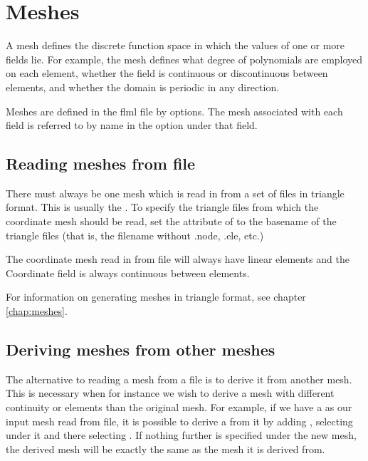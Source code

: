 \section{Meshes}\label{Sect:Mesh}

A mesh defines the discrete
function space in which the values of one or more fields lie. For example, the mesh
defines what degree of polynomials are employed on each element, whether the
field is continuous or discontinuous between elements, and whether the
domain is periodic in any direction. 

Meshes are defined in the flml file by  options. The
mesh associated with each field is referred to by name in the
 option under that field.

\subsection{Reading meshes from file}
There must always be one mesh which is read in from a set of files in
triangle format. This is usually the . To specify the
triangle files from which the coordinate mesh should be read, set the
 attribute of
 to the basename
of the triangle files (that is, the filename without .node, .ele, etc.)

The coordinate mesh read in from file will always have linear elements and
the Coordinate field is always continuous between elements.

For information on generating meshes in triangle format, see chapter
\ref{chap:meshes}. 

\subsection{Deriving meshes from other meshes}
The alternative to reading a mesh from a file is to derive it from another
mesh. This is necessary when for instance we wish to derive a mesh with
different continuity or elements than the original mesh. 
For example, if we have a  as our input mesh read 
from file, it is possible to derive a  from it
by adding , selecting 
 under it and there selecting
. If nothing further is specified 
under the new mesh, the derived mesh will be exactly the same as the mesh
it is derived from.

